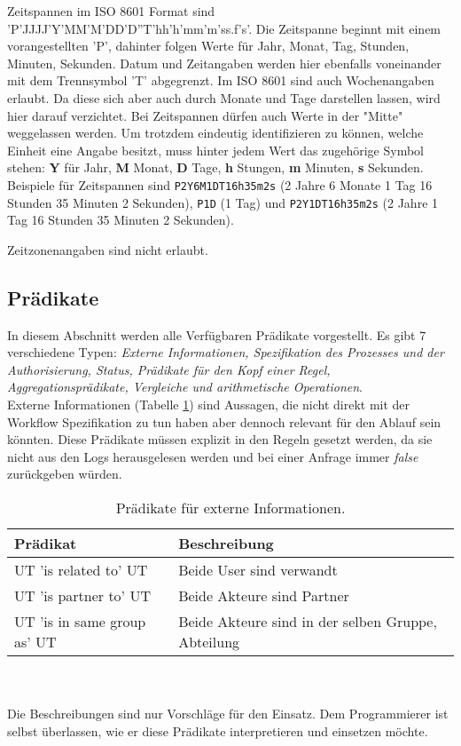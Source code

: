 Zeitspannen im ISO 8601 Format sind 'P'JJJJ'Y'MM'M'DD'D''T'hh'h'mm'm'ss.f's'. Die Zeitspanne beginnt mit einem vorangestellten 'P', dahinter folgen Werte für Jahr, Monat, Tag, Stunden, Minuten, Sekunden. Datum und Zeitangaben werden hier ebenfalls voneinander mit dem Trennsymbol 'T' abgegrenzt. Im ISO 8601 sind auch Wochenangaben erlaubt. Da diese sich aber auch durch Monate und Tage darstellen lassen, wird hier darauf verzichtet. Bei Zeitspannen dürfen auch Werte in der "Mitte" weggelassen werden. Um trotzdem eindeutig identifizieren zu können, welche Einheit eine Angabe besitzt, muss hinter jedem Wert das zugehörige Symbol stehen: \textbf{Y} für Jahr, \textbf{M} Monat, \textbf{D} Tage, \textbf{h} Stungen, \textbf{m} Minuten, \textbf{s} Sekunden. Beispiele für Zeitspannen sind \texttt{P2Y6M1DT16h35m2s} (2 Jahre 6 Monate 1 Tag 16 Stunden 35 Minuten 2 Sekunden), \texttt{P1D} (1 Tag) und \texttt{P2Y1DT16h35m2s} (2 Jahre 1 Tag 16 Stunden 35 Minuten 2 Sekunden).

Zeitzonenangaben sind nicht erlaubt.

\subsection{Prädikate}
In diesem Abschnitt werden alle Verfügbaren Prädikate vorgestellt. Es gibt  7 verschiedene Typen: \textit{Externe Informationen, Spezifikation des Prozesses und der Authorisierung, Status, Prädikate für den Kopf einer Regel, Aggregationsprädikate, Vergleiche und arithmetische Operationen}. \\

Externe Informationen (Tabelle \ref{tab:extern}) sind Aussagen, die nicht direkt mit der Workflow Spezifikation zu tun haben aber dennoch relevant für den Ablauf sein könnten. Diese Prädikate müssen explizit in den Regeln gesetzt werden, da sie nicht aus den Logs herausgelesen werden und bei einer Anfrage immer \textit{false} zurückgeben würden.
\begin{table}[h]
\begin{tabular} {|p{6cm}|p{10cm}|}
\hline
\textbf{Prädikat} & \textbf{Beschreibung}\\
\hline
UT 'is related to' UT 		& Beide User sind verwandt \\
\hline
UT 'is partner to' UT		& Beide Akteure sind Partner \\
\hline
UT 'is in same group as' UT	& Beide Akteure sind in der selben Gruppe, Abteilung\\
\hline
\end{tabular}
\\\\\small Die Beschreibungen sind nur Vorschläge für den Einsatz. Dem Programmierer ist selbst überlassen, wie er diese Prädikate interpretieren und einsetzen möchte.
\caption{Prädikate für externe Informationen.}
\label{tab:extern}
\end{table}

